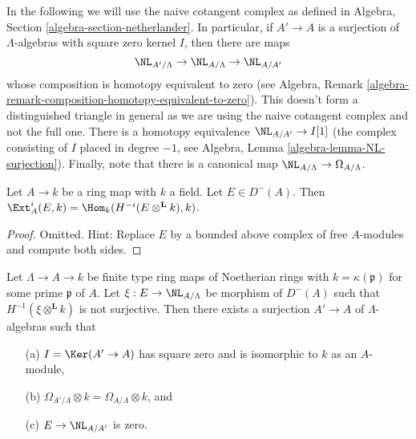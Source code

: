 \medskip\noindent
In the following we will use the naive cotangent complex as
defined in Algebra, Section \ref{algebra-section-netherlander}.
In particular, if $A' \to A$ is a surjection of $\Lambda$-algebras
with square zero kernel $I$, then there are maps
$$
\NL_{A'/\Lambda} \to \NL_{A/\Lambda} \to \NL_{A/A'}
$$
whose composition is homotopy equivalent to zero (see
Algebra, Remark \ref{algebra-remark-composition-homotopy-equivalent-to-zero}).
This doesn't form a distinguished triangle in general as we are using
the naive cotangent complex and not the full one.
There is a homotopy equivalence $\NL_{A/A'} \to I[1]$ (the complex
consisting of $I$ placed in degree $-1$, see
Algebra, Lemma \ref{algebra-lemma-NL-surjection}).
Finally, note that there is a canonical map
$\NL_{A/\Lambda} \to \Omega_{A/\Lambda}$.

\begin{lemma}
\label{lemma-compute-ext-into-field}
Let $A \to k$ be a ring map with $k$ a field. Let $E \in D^-(A)$.
Then $\Ext^i_A(E, k) = \Hom_k(H^{-i}(E \otimes^\mathbf{L} k), k)$.
\end{lemma}

\begin{proof}
Omitted. Hint: Replace $E$ by a bounded above complex of free $A$-modules
and compute both sides.
\end{proof}

\begin{lemma}
\label{lemma-construct-essential-surjection}
Let $\Lambda \to A \to k$ be finite type ring maps of Noetherian rings with
$k = \kappa(\mathfrak p)$ for some prime $\mathfrak p$ of $A$. Let
$\xi : E \to \NL_{A/\Lambda}$ be morphism of $D^{-}(A)$ such that
$H^{-1}(\xi \otimes^{\mathbf{L}} k)$ is not surjective.
Then there exists a surjection $A' \to A$ of $\Lambda$-algebras
such that
\begin{enumerate}
\item[(a)] $I = \Ker(A' \to A)$ has square zero and is isomorphic to $k$
as an $A$-module,
\item[(b)] $\Omega_{A'/\Lambda} \otimes k = \Omega_{A/\Lambda} \otimes k$, and
\item[(c)] $E \to \NL_{A/A'}$ is zero.
\end{enumerate}
\end{lemma}

